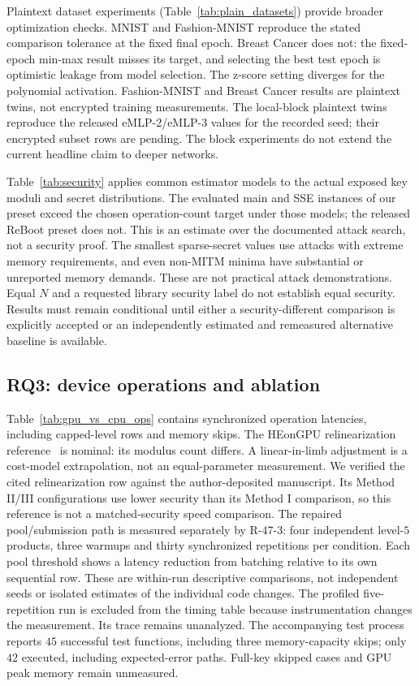 Plaintext dataset experiments (Table~\ref{tab:plain_datasets}) provide broader optimization checks. MNIST and Fashion-MNIST reproduce the stated comparison tolerance at the fixed final epoch. Breast Cancer does not: the fixed-epoch min-max result misses its target, and selecting the best test epoch is optimistic leakage from model selection. The z-score setting diverges for the polynomial activation. Fashion-MNIST and Breast Cancer results are plaintext twins, not encrypted training measurements. The local-block plaintext twins reproduce the released eMLP-2/eMLP-3 values for the recorded seed; their encrypted subset rows are pending. The block experiments do not extend the current headline claim to deeper networks.

Table~\ref{tab:security} applies common estimator models to the actual exposed key moduli and secret distributions. The evaluated main and SSE instances of our preset exceed the chosen operation-count target under those models; the released ReBoot preset does not. This is an estimate over the documented attack search, not a security proof. The smallest sparse-secret values use attacks with extreme memory requirements, and even non-MITM minima have substantial or unreported memory demands. These are not practical attack demonstrations. Equal $N$ and a requested library security label do not establish equal security. Results must remain conditional until either a security-different comparison is explicitly accepted or an independently estimated and remeasured alternative baseline is available.

\subsection{RQ3: device operations and ablation}


Table~\ref{tab:gpu_vs_cpu_ops} contains synchronized operation latencies, including capped-level rows and memory skips. The HEonGPU relinearization reference~\cite{gpuKeys2025} is nominal: its modulus count differs. A linear-in-limb adjustment is a cost-model extrapolation, not an equal-parameter measurement. We verified the cited relinearization row against the author-deposited manuscript. Its Method II/III configurations use lower security than its Method I comparison, so this reference is not a matched-security speed comparison. The repaired pool/submission path is measured separately by R-47-3: four independent level-$5$ products, three warmups and thirty synchronized repetitions per condition. Each pool threshold shows a latency reduction from batching relative to its own sequential row. These are within-run descriptive comparisons, not independent seeds or isolated estimates of the individual code changes. The profiled five-repetition run is excluded from the timing table because instrumentation changes the measurement. Its trace remains unanalyzed. The accompanying test process reports $45$ successful test functions, including three memory-capacity skips; only $42$ executed, including expected-error paths. Full-key skipped cases and GPU peak memory remain unmeasured.

